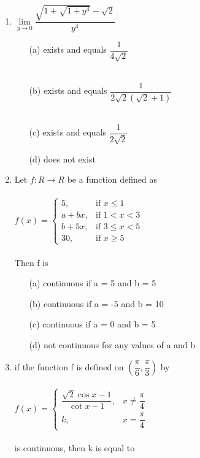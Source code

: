 \documentclass[journal,12pt,twocolumn]{IEEEtran}
\begin{document}
\begin{enumerate}
\item $\lim\limits_{y \to 0}\dfrac{\sqrt{1+\sqrt{1+y^4}}-\sqrt{2}}{y^4}$
\begin{itemize}
\item[(a)] exists and equals $\dfrac{1}{4\sqrt{2}}$\\ \\
\item[(b)] exists and equals $\dfrac{1}{2\sqrt{2}(\sqrt{2}+1)}$\\ \\
\item[(c)] exists and equals $\dfrac{1}{2\sqrt{2}}$\\ 
\item[(d)] does not exist
\end{itemize}

\item Let $f: R \to R$ be a function defined as\\ \\
$f(x)=\begin{cases}
5, &\text{if $x\leq 1$}\\
a+bx, &\text{if $1<x<3$}\\
b+5x, &\text{if $3\leq x<5$}\\
30, &\text{if $x\geq 5$}
\end{cases}$ \\ \\Then f is
\begin{itemize}
\item[(a)] continuous if a = 5 and b = 5
\item[(b)] continuous if a = -5 and b = 10
\item[(c)] continuous if a = 0 and b = 5
\item[(d)] not continuous for any values of a and b
\end{itemize}

\item if the function f is defined on $\left(\dfrac{\pi}{6},\dfrac{\pi}{3}\right)$ by \\ \\
$f(x)=\begin{cases}
\dfrac{\sqrt{2}\cos x-1}{\cot x-1}, &\text{$x\neq \dfrac{\pi}{4}$}\\
k, &\text{$x=\dfrac{\pi}{4}$}
\end{cases}$\\ \\ is continuous, then k is equal to
\begin{itemize}
\end{itemize}


\end{enumerate}
\end{document}
